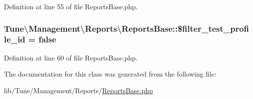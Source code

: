 Definition at line 55 of file Reports\-Base.\-php.

\hypertarget{classTune_1_1Management_1_1Reports_1_1ReportsBase_a2a621a3704fdccb98094c2f94bc6180e}{
\subsubsection[{\$filter\-\_\-test\-\_\-profile\-\_\-id}]{\setlength{\rightskip}{0pt plus 5cm}Tune\textbackslash{}\-Management\textbackslash{}\-Reports\textbackslash{}\-Reports\-Base\-::\$filter\-\_\-test\-\_\-profile\-\_\-id = false\hspace{0.3cm}{\ttfamily [protected]}}}\label{classTune_1_1Management_1_1Reports_1_1ReportsBase_a2a621a3704fdccb98094c2f94bc6180e}


Definition at line 60 of file Reports\-Base.\-php.



The documentation for this class was generated from the following file\-:\begin{DoxyCompactItemize}
\item 
lib/\-Tune/\-Management/\-Reports/\hyperlink{ReportsBase_8php}{Reports\-Base.\-php}\end{DoxyCompactItemize}
